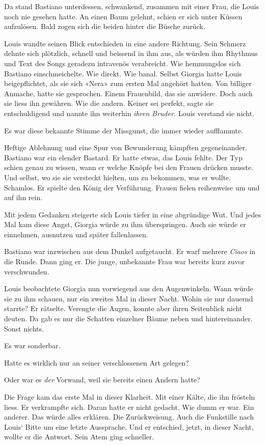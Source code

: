 Da stand Bastiano unterdessen, schwankend, zusammen mit einer Frau, die
Louis noch nie gesehen hatte. An einen Baum gelehnt, schien er sich
unter Küssen aufzulösen. Bald zogen sich die beiden hinter die Büsche
zurück.

Louis wandte seinen Blick entschieden in eine andere Richtung. Sein
Schmerz dehnte sich plötzlich, schnell und beissend in ihm aus, als
würden ihm Rhythmus und Text des Songs geradezu intravenös verabreicht.
Wie hemmungslos sich Bastiano einschmeichelte. Wie direkt. Wie banal.
Selbst Giorgia hatte Louis beigepflichtet, als sie sich «Nera» zum
ersten Mal angehört hatten. Von billiger Anmache, hatte sie gesprochen.
Einem Frauenbild, das sie anwidere. Doch auch sie liess ihn gewähren.
Wie die andern. Keiner sei perfekt, sagte sie entschuldigend und nannte
ihn weiterhin \emph{ihren Bruder.} Louis verstand sie nicht.

Es war diese bekannte Stimme der Missgunst, die immer wieder aufflammte.

Heftige Ablehnung und eine Spur von Bewunderung kämpften gegeneinander.
Bastiano war ein elender Bastard. Er hatte etwas, das Louis fehlte. Der
Typ schien genau zu wissen, wann er welche Knöpfe bei den Frauen drücken
musste. Und selbst, wo sie sie versteckt hielten, um zu bekommen, was er
wollte. Schamlos. Er spielte den König der Verführung. Frauen fielen
reihenweise um und auf ihn rein.

Mit jedem Gedanken steigerte sich Louis tiefer in eine abgründige Wut.
Und jedes Mal kam diese Angst, Giorgia würde zu ihm überspringen. Auch
sie würde er einnehmen, ausnutzen und später fallenlassen.

Bastiano war inzwischen aus dem Dunkel aufgetaucht. Er warf mehrere
\emph{Ciaos} in die Runde. Dann ging er. Die junge, unbekannte Frau war
bereits kurz zuvor verschwunden.

Louis beobachtete Giorgia nun vorwiegend aus den Augenwinkeln. Wann
würde sie zu ihm schauen, nur ein zweites Mal in dieser Nacht. Wohin sie
nur dauernd starrte? Er rätselte. Verengte die Augen, konnte aber ihren
Seitenblick nicht deuten. Da gab es nur die Schatten einzelner Bäume
neben und hintereinander. Sonst nichts.

Es war sonderbar.

Hatte es wirklich nur an seiner verschlossenen Art gelegen?

Oder war es \emph{der} Vorwand, weil sie bereits einen Andern hatte?

Die Frage kam das erste Mal in dieser Klarheit. Mit einer Kälte, die ihn
frösteln liess. Er verkrampfte sich. Daran hatte er nicht gedacht. Wie
dumm er war. Ein anderer. Das würde alles erklären. Die Zurückweisung.
Auch die Funkstille nach Louis` Bitte um eine letzte Aussprache. Und er
entschied, jetzt, in dieser Nacht, wollte er die Antwort. Sein Atem ging
schneller.

